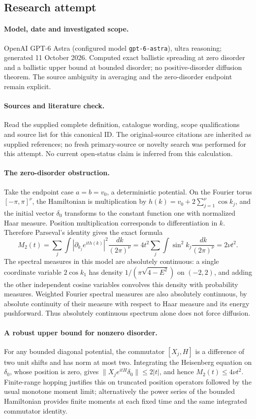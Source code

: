 \documentclass[11pt]{article}
\begin{document}
\subsection{Research attempt}
\paragraph{Model, date and investigated scope.}
OpenAI GPT-6 Astra (configured model \texttt{gpt-6-astra}), ultra reasoning; generated 11 October 2026. Computed exact ballistic spreading at zero disorder and a ballistic upper bound at bounded disorder; no positive-disorder diffusion theorem. The source ambiguity in averaging and the zero-disorder endpoint remain explicit.

\paragraph{Sources and literature check.}
Read the supplied complete definition, catalogue wording, scope qualifications and source list for this canonical ID. The original-source citations are inherited as supplied references; no fresh primary-source or novelty search was performed for this attempt. No current open-status claim is inferred from this calculation.

\paragraph{The zero-disorder obstruction.}Take the endpoint case \(a=b=v_0\), a deterministic potential. On the Fourier torus \([-\pi,\pi]^\nu\), the Hamiltonian is multiplication by \(h(k)=v_0+2\sum_{j=1}^\nu\cos k_j\), and the initial vector \(\delta_0\) transforms to the constant function one with normalized Haar measure. Position multiplication corresponds to differentiation in \(k\). Therefore Parseval's identity gives the exact formula
\[M_2(t)=\sum_j\int\left|\partial_{k_j}e^{ith(k)}\right|^2\frac{dk}{(2\pi)^\nu}=4t^2\sum_j\int\sin^2k_j\frac{dk}{(2\pi)^\nu}=2\nu t^2.\]
The spectral measures in this model are absolutely continuous: a single coordinate variable \(2\cos k_1\) has density \(1/(\pi\sqrt{4-E^2})\) on \((-2,2)\), and adding the other independent cosine variables convolves this density with probability measures. Weighted Fourier spectral measures are also absolutely continuous, by absolute continuity of their measure with respect to Haar measure and its energy pushforward. Thus absolutely continuous spectrum alone does not force diffusion.
\paragraph{A robust upper bound for nonzero disorder.}For any bounded diagonal potential, the commutator \([X_j,H]\) is a difference of two unit shifts and has norm at most two. Integrating the Heisenberg equation on \(\delta_0\), whose position is zero, gives \(\|X_je^{itH}\delta_0\|\le2|t|\), and hence \(M_2(t)\le4\nu t^2\). Finite-range hopping justifies this on truncated position operators followed by the usual monotone moment limit; alternatively the power series of the bounded Hamiltonian provides finite moments at each fixed time and the same integrated commutator identity.
\end{document}
